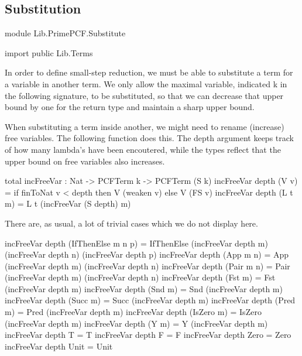 \subsection{Substitution}

\begin{hidden}
module Lib.PrimePCF.Substitute

import public Lib.Terms
\end{hidden}

In order to define small-step reduction, we must be able to substitute a term
for a variable in another term.
We only allow the maximal variable, indicated k in the following signature, to be substituted,
so that we can decrease that upper bound by one for the return type and maintain a sharp upper bound.

When substituting a term inside another, we might need to rename (increase)
free variables. The following function does this.
The depth argument keeps track of how many lambda's have been encoutered,
while the types reflect that the upper bound on free variables also increases.

\begin{code}
total incFreeVar : Nat -> PCFTerm k -> PCFTerm (S k)
incFreeVar depth (V v)    = if finToNat v < depth
                              then V (weaken v)
                            else V (FS v)
incFreeVar depth (L t m)  = L t (incFreeVar (S depth) m)
\end{code}

There are, as usual, a lot of trivial cases which we do not display here.

\begin{hidden}
incFreeVar depth (IfThenElse m n p) = IfThenElse (incFreeVar depth m) (incFreeVar depth n) (incFreeVar depth p)
incFreeVar depth (App m n)          = App (incFreeVar depth m) (incFreeVar depth n)
incFreeVar depth (Pair m n)         = Pair (incFreeVar depth m) (incFreeVar depth n)
incFreeVar depth (Fst m)            = Fst (incFreeVar depth m)
incFreeVar depth (Snd m)            = Snd (incFreeVar depth m)
incFreeVar depth (Succ m)           = Succ (incFreeVar depth m)
incFreeVar depth (Pred m)           = Pred (incFreeVar depth m)
incFreeVar depth (IsZero m)         = IsZero (incFreeVar depth m)
incFreeVar depth (Y m)              = Y (incFreeVar depth m)
incFreeVar depth T                  = T
incFreeVar depth F                  = F
incFreeVar depth Zero               = Zero
incFreeVar depth Unit               = Unit
\end{hidden}

